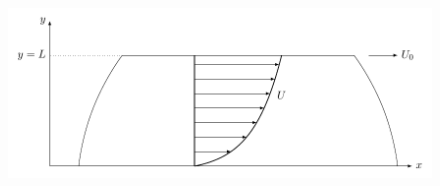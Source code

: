\begin{figure}[H]
  \centering
  \includegraphics{illustrations/couette-poiseuille.pdf}
  \label{fig:label}
\end{figure}






\clearpage



